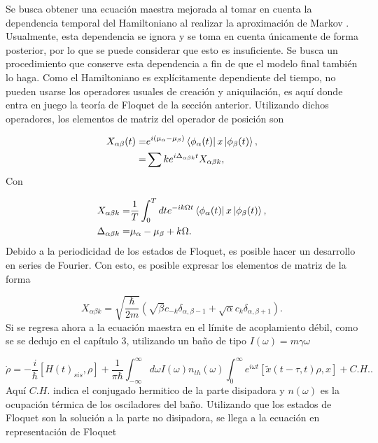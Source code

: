 \documentclass[a4paper,10pt]{report}
\begin{document}
Se busca obtener una ecuación maestra mejorada al tomar en cuenta la dependencia temporal del Hamiltoniano al realizar la aproximación de Markov \cite{HanngiDQS}. Usualmente, esta dependencia se ignora y se toma en cuenta únicamente de forma posterior, por lo que se puede considerar que esto es insuficiente. Se busca un procedimiento que conserve esta dependencia a fin de que el modelo final también lo haga. Como el Hamiltoniano es explícitamente dependiente del tiempo, no pueden usarse los operadores usuales de creación y aniquilación, es aquí donde entra en juego la teoría de Floquet de la sección anterior. Utilizando dichos operadores, los elementos de matriz del operador de posición son

\begin{align}
X_{\alpha \beta}(t) =& e^{i(\mu_{\alpha}-\mu_{\beta})}\Bra{\phi_{\alpha}(t)}x\Ket{\phi_{\beta}(t)},\\
=& \sum{k} e^{i\Delta_{\alpha\beta k}t} X_{\alpha\beta k},
\end{align}Con

\begin{align*}
X_{\alpha\beta k} =& \frac{1}{T} \int_0^T dt e^{-ik\Omega t}\Bra{\phi_{\alpha}(t)}x\Ket{\phi_{\beta}(t)}, \\
\Delta_{\alpha \beta k} =& \mu_{\alpha}-\mu_{\beta} + k\Omega.
\end{align*}Debido a la periodicidad de los estados de Floquet, es posible hacer un desarrollo en series de Fourier. Con esto, es posible expresar los elementos de matriz de la forma

\begin{equation}
X_{\alpha\beta k} = \sqrt{\frac{\hbar}{2m}}(\sqrt{\beta}c_{-k} \delta_{\alpha,\beta-1}+\sqrt{\alpha}c_k\delta_{\alpha,\beta+1}).
\end{equation} Si se regresa ahora a la ecuación maestra en el límite de acoplamiento débil, como se se dedujo en el capítulo 3, utilizando un baño de tipo $I(\omega) = m\gamma \omega$

\begin{equation}
\dot{\rho} = -\frac{i}{\hbar}[H(t)_{sis},\rho] + \frac{1}{\pi \hbar} \int_{-\infty}^\infty d\omega I(\omega)n_{th}(\omega)\int_0^\infty e^{i\omega t}[\tilde{x}(t-\tau,t)\rho,x] + C.H..
\end{equation}Aquí $C.H.$ indica el conjugado hermitico de la parte disipadora y $n(\omega)$ es la ocupación térmica de los osciladores del baño. Utilizando que los estados de Floquet son la solución a la parte no disipadora, se llega a la ecuación en representación de Floquet
\end{document}
